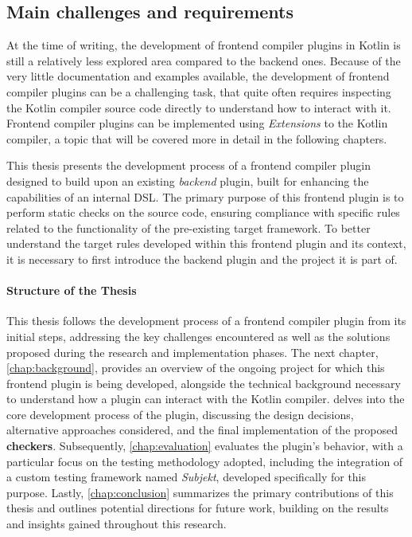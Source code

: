 \documentclass[12pt,a4paper,openright,twoside]{book}
\begin{document}
\subsection{Main challenges and requirements}

At the time of writing, the development of frontend compiler plugins in Kotlin
is still a relatively less explored area compared to the backend ones. Because
of the very little documentation and examples available, the development of
frontend compiler plugins can be a challenging task, that quite often requires
inspecting the Kotlin compiler source code directly to understand how to
interact with it.
%
Frontend compiler plugins can be implemented using \textit{Extensions} to the
Kotlin compiler, a topic that will be covered more in detail in the following
chapters. 

This thesis presents the development process of a frontend compiler plugin
designed to build upon an existing \textit{backend} plugin, built for enhancing
the capabilities of an internal \ac{DSL}. The primary purpose of this frontend
plugin is to perform static checks on the source code, ensuring compliance with
specific rules related to the functionality of the pre-existing target
framework. To better understand the target rules developed within this frontend
plugin and its context, it is necessary to first introduce the backend plugin
and the project it is part of.

\paragraph{Structure of the Thesis}

This thesis follows the development process of a frontend compiler plugin from
its initial steps, addressing the key challenges encountered as well as the
solutions proposed during the research and implementation phases. The next
chapter, \cref{chap:background}, provides an overview of the ongoing project for
which this frontend plugin is being developed, alongside the technical
background necessary to understand how a plugin can interact with the Kotlin
compiler.
%
 delves into the core development process of the plugin,
discussing the design decisions, alternative approaches considered, and the
final implementation of the proposed \textbf{checkers}. Subsequently,
\cref{chap:evaluation} evaluates the plugin’s behavior, with a particular focus
on the testing methodology adopted, including the integration of a custom
testing framework named \emph{Subjekt}, developed specifically for this purpose.
%
Lastly, \cref{chap:conclusion} summarizes the primary contributions of this
thesis and outlines potential directions for future work, building on the
results and insights gained throughout this research.
\end{document}
